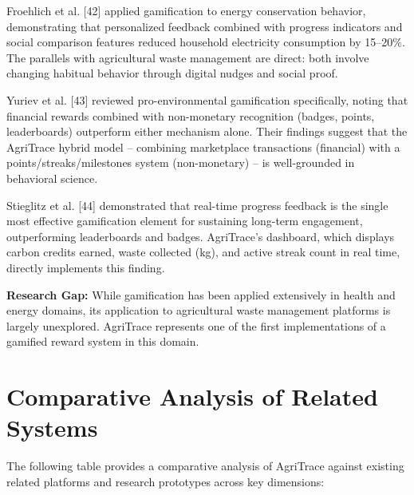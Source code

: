\documentclass[a4paper,12pt,oneside]{report}
\begin{document}
Froehlich et al. [42] applied gamification to energy conservation behavior, demonstrating that personalized feedback combined with progress indicators and social comparison features reduced household electricity consumption by 15--20\%. The parallels with agricultural waste management are direct: both involve changing habitual behavior through digital nudges and social proof.

Yuriev et al. [43] reviewed pro-environmental gamification specifically, noting that financial rewards combined with non-monetary recognition (badges, points, leaderboards) outperform either mechanism alone. Their findings suggest that the AgriTrace hybrid model -- combining marketplace transactions (financial) with a points/streaks/milestones system (non-monetary) -- is well-grounded in behavioral science.

Stieglitz et al. [44] demonstrated that real-time progress feedback is the single most effective gamification element for sustaining long-term engagement, outperforming leaderboards and badges. AgriTrace's dashboard, which displays carbon credits earned, waste collected (kg), and active streak count in real time, directly implements this finding.

\textbf{Research Gap:} While gamification has been applied extensively in health and energy domains, its application to agricultural waste management platforms is largely unexplored. AgriTrace represents one of the first implementations of a gamified reward system in this domain.

\section{Comparative Analysis of Related Systems}

\noindent The following table provides a comparative analysis of AgriTrace against existing related platforms and research prototypes across key dimensions:
\end{document}
